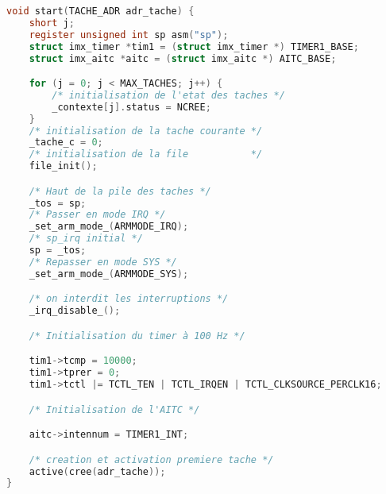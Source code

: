 \documentclass{article}
\begin{document}
\begin{lstlisting}[language=C, caption=noyau.c]
void start(TACHE_ADR adr_tache) {
    short j;
    register unsigned int sp asm("sp");
    struct imx_timer *tim1 = (struct imx_timer *) TIMER1_BASE;
    struct imx_aitc *aitc = (struct imx_aitc *) AITC_BASE;

    for (j = 0; j < MAX_TACHES; j++) {
        /* initialisation de l'etat des taches */
        _contexte[j].status = NCREE;
    }
    /* initialisation de la tache courante */
    _tache_c = 0;
    /* initialisation de la file           */
    file_init();

    /* Haut de la pile des taches */
    _tos = sp;
    /* Passer en mode IRQ */
    _set_arm_mode_(ARMMODE_IRQ);
    /* sp_irq initial */
    sp = _tos;
    /* Repasser en mode SYS */
    _set_arm_mode_(ARMMODE_SYS);

    /* on interdit les interruptions */
    _irq_disable_();

    /* Initialisation du timer à 100 Hz */

    tim1->tcmp = 10000;
    tim1->tprer = 0;
    tim1->tctl |= TCTL_TEN | TCTL_IRQEN | TCTL_CLKSOURCE_PERCLK16;

    /* Initialisation de l'AITC */

    aitc->intennum = TIMER1_INT;

    /* creation et activation premiere tache */
    active(cree(adr_tache));
}
\end{lstlisting}
\end{document}
